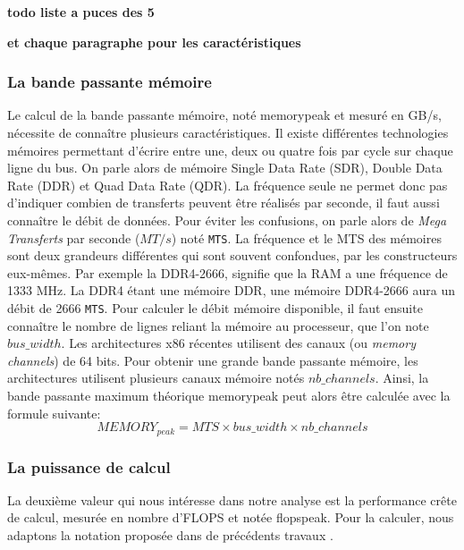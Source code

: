     \textbf{todo liste a puces des 5}
    
    \textbf{et chaque paragraphe pour les caractéristiques}
    
 
    \subsubsection{La bande passante mémoire}
        Le calcul de la bande passante mémoire, noté \gls{memorypeak} et mesuré en GB/s, nécessite de connaître plusieurs caractéristiques. Il existe différentes technologies mémoires permettant d'écrire entre une, deux ou quatre fois par cycle sur chaque ligne du bus. On parle alors de mémoire Single Data Rate (SDR), Double Data Rate (DDR) et Quad Data Rate (QDR). La fréquence seule ne permet donc pas d'indiquer combien de transferts peuvent être réalisés par seconde, il faut aussi connaître le débit de données. Pour éviter les confusions, on parle alors de \textit{Mega Transferts} par seconde ($MT/s$) noté \verb|MTS|. La fréquence et le MTS des mémoires sont deux grandeurs différentes qui sont souvent confondues, par les constructeurs eux-mêmes. Par exemple la DDR4-2666, signifie que la RAM a une fréquence de 1333 MHz. La DDR4 étant une mémoire DDR, une mémoire DDR4-2666 aura un débit de 2666 \verb|MTS|. Pour calculer le débit mémoire disponible, il faut ensuite connaître le nombre de lignes reliant la mémoire au processeur, que l'on note $bus\_width$. Les architectures x86 récentes utilisent des canaux (ou \textit{memory channels}) de 64 bits. Pour obtenir une grande bande passante mémoire, les architectures utilisent plusieurs canaux mémoire notés $nb\_channels$. Ainsi, la bande passante maximum théorique \gls{memorypeak} peut alors être calculée avec la formule suivante:
        \begin{equation}
        \label{eq:bw}
            MEMORY_{peak} = MTS \times bus\_width \times nb\_channels
        \end{equation}
    
    
    
    \subsubsection{La puissance de calcul}
        
        La deuxième valeur qui nous intéresse dans notre analyse est la performance crête de calcul, mesurée en nombre d'\gls{FLOPS} et notée \gls{flopspeak}. Pour la calculer, nous adaptons la notation proposée dans de précédents travaux \cite{dolbeau2015theoretical}.
        
